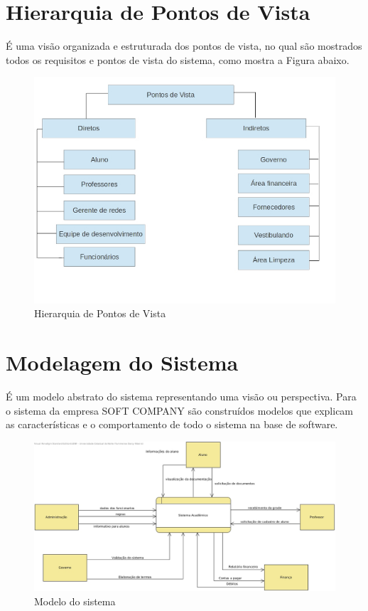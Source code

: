 \section {Hierarquia de Pontos de Vista}
	
É uma visão organizada e estruturada dos pontos de vista, no qual são mostrados todos os requisitos e pontos de vista do sistema, como mostra a Figura abaixo.
   \begin{figure}[H]
	      \centering
	       \includegraphics[width=15cm]{hierarquia2}
	       \caption{Hierarquia de Pontos de Vista}
	       \label{figRotulo}
               \end{figure}
               
               
    
 \section{Modelagem do Sistema}
 
 É um modelo abstrato do sistema representando uma visão ou perspectiva.
 Para o sistema da empresa SOFT COMPANY são construídos modelos que explicam as características
 e o comportamento de todo o sistema na base de software.
 
   \begin{figure}[H]
	      \centering
	       \includegraphics[width=15cm]{diagramaContexto.jpg}
	       \caption{Modelo do sistema}
	       \label{figRotulo}
               \end{figure}
               
